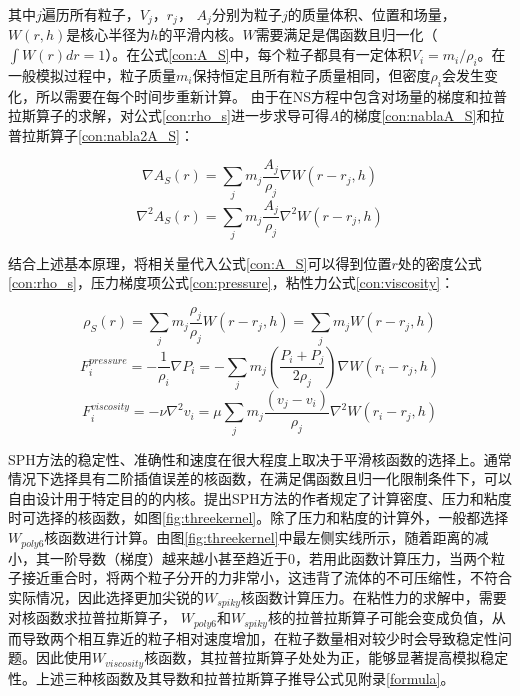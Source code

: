 其中$j$遍历所有粒子，$V_j$，$r_j$， $A_j$分别为粒子$j$的质量体积、位置和场量，$W(r,h)$是核心半径为$h$的平滑内核。$W$需要满足是偶函数且归一化（$\int W(r)dr=1$）。在公式\eqref{con:A_S}中，每个粒子都具有一定体积$V_i=m_i/\rho_i$。在一般模拟过程中，粒子质量$m_i$保持恒定且所有粒子质量相同，但密度$\rho_i$会发生变化，所以需要在每个时间步重新计算。
由于在NS方程中包含对场量的梯度和拉普拉斯算子的求解，对公式\eqref{con:rho_s}进一步求导可得$A$的梯度\eqref{con:nablaA_S}和拉普拉斯算子\eqref{con:nabla2A_S}：

\begin{equation}
    \nabla A_S(r) = \sum_j m_j \frac{A_j}{\rho_j} \nabla W(r-r_j,h)\label{con:nablaA_S}
\end{equation}
\begin{equation}
    \nabla^2 A_S(r) = \sum_j m_j \frac{A_j}{\rho_j} \nabla^2 W(r-r_j,h)\label{con:nabla2A_S}
\end{equation}

结合上述基本原理，将相关量代入公式\eqref{con:A_S}可以得到位置$r$处的密度公式\eqref{con:rho_s}，压力梯度项公式\eqref{con:pressure}，粘性力公式\eqref{con:viscosity}：

\begin{equation}
    \rho_S(r) = \sum_j m_j \frac{\rho_j}{\rho_j}W(r-r_j,h)=\sum_jm_jW(r-r_j,h)\label{con:rho_s}
\end{equation}
\begin{equation}
    F_i^{pressure} = -\frac{1}{\rho_i} \nabla P_i =  -\sum_j m_j \left( \frac{P_i + P_j}{2\rho_j} \right) \nabla W(r_i - r_j, h)
    \label{con:pressure}
\end{equation}
\begin{equation}
    F_i^{viscosity} = - \nu \nabla^2 v_i =  \mu \sum_j m_j \frac{(v_j - v_i)}{\rho_j} \nabla^2 W(r_i - r_j, h)
    \label{con:viscosity}
\end{equation}

SPH方法的稳定性、准确性和速度在很大程度上取决于平滑核函数的选择上。通常情况下选择具有二阶插值误差的核函数，在满足偶函数且归一化限制条件下，可以自由设计用于特定目的的内核。提出SPH方法的作者\cite{muller2003particle}规定了计算密度、压力和粘度时可选择的核函数，如图\ref{fig:threekernel}。除了压力和粘度的计算外，一般都选择$W_{poly6}$核函数进行计算。由图\ref{fig:threekernel}中最左侧实线所示，随着距离的减小，其一阶导数（梯度）越来越小甚至趋近于$0$，若用此函数计算压力，当两个粒子接近重合时，将两个粒子分开的力非常小，这违背了流体的不可压缩性，不符合实际情况，因此选择更加尖锐的$W_{spiky}$核函数计算压力。在粘性力的求解中，需要对核函数求拉普拉斯算子， $W_{poly6}$和$W_{spiky}$核的拉普拉斯算子可能会变成负值，从而导致两个相互靠近的粒子相对速度增加，在粒子数量相对较少时会导致稳定性问题。因此使用$W_{viscosity}$核函数，其拉普拉斯算子处处为正，能够显著提高模拟稳定性。上述三种核函数及其导数和拉普拉斯算子推导公式见附录\ref{formula}。

